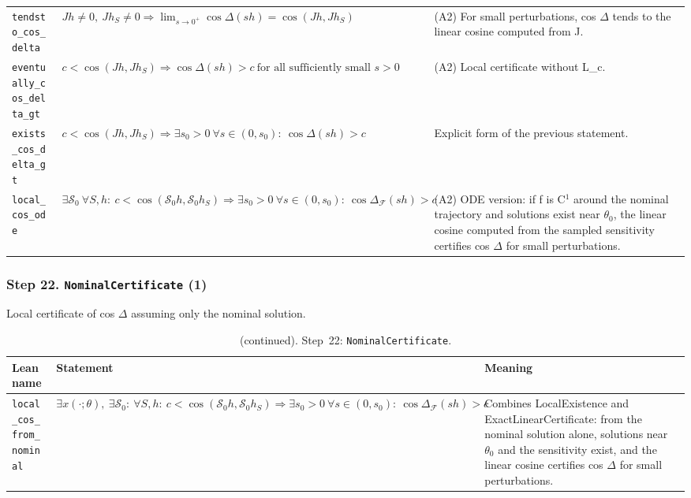 {\begin{longtable}{@{}>{\raggedright\arraybackslash}p{3.6cm}>{\raggedright\arraybackslash}p{6.6cm}>{\raggedright\arraybackslash}p{5.6cm}@{}}
\texttt{tendsto\_\allowbreak{}cos\_\allowbreak{}delta} & $\displaystyle Jh\ne0,\ Jh_S\ne0\Rightarrow\lim_{s\to0^+}\cos\Delta(sh)=\cos(Jh,Jh_S)$ & (A2) For small perturbations, cos $\Delta$ tends to the linear cosine computed from J. \\[3pt]
\texttt{eventually\_\allowbreak{}cos\_\allowbreak{}delta\_\allowbreak{}gt} & $\displaystyle c<\cos(Jh,Jh_S)\Rightarrow\cos\Delta(sh)>c\ \text{for all sufficiently small } s>0$ & (A2) Local certificate without L\_c. \\[3pt]
\texttt{exists\_\allowbreak{}cos\_\allowbreak{}delta\_\allowbreak{}gt} & $\displaystyle c<\cos(Jh,Jh_S)\Rightarrow\exists s_0>0\ \forall s\in(0,s_0):\ \cos\Delta(sh)>c$ & Explicit form of the previous statement. \\[3pt]
\texttt{local\_\allowbreak{}cos\_\allowbreak{}ode} & $\displaystyle \exists\mathcal S_0\ \forall S,h:\ c<\cos(\mathcal S_0h,\mathcal S_0h_S)\Rightarrow\exists s_0>0\ \forall s\in(0,s_0):\ \cos\Delta_{\mathcal F}(sh)>c$ & (A2) ODE version: if f is C$^1$ around the nominal trajectory and solutions exist near $\theta_0$, the linear cosine computed from the sampled sensitivity certifies cos $\Delta$ for small perturbations. \\[3pt]
\bottomrule
\end{longtable}
}

\subsubsection*{Step 22. \texttt{NominalCertificate} (1)}
Local certificate of cos $\Delta$ assuming only the nominal solution.

\addtocounter{table}{-1}
{\small
\begin{longtable}{@{}>{\raggedright\arraybackslash}p{3.6cm}>{\raggedright\arraybackslash}p{6.6cm}>{\raggedright\arraybackslash}p{5.6cm}@{}}
\caption[]{(continued). Step~22: \texttt{NominalCertificate}.}\\
\toprule
Lean name & Statement & Meaning \\
\midrule
\endhead
\texttt{local\_\allowbreak{}cos\_\allowbreak{}from\_\allowbreak{}nominal} & $\displaystyle \exists x(\cdot;\theta),\ \exists\mathcal S_0:\ \forall S,h:\ c<\cos(\mathcal S_0h,\mathcal S_0h_S)\Rightarrow\exists s_0>0\ \forall s\in(0,s_0):\ \cos\Delta_{\mathcal F}(sh)>c$ & Combines LocalExistence and ExactLinearCertificate: from the nominal solution alone, solutions near $\theta_0$ and the sensitivity exist, and the linear cosine certifies cos $\Delta$ for small perturbations. \\[3pt]
\bottomrule
\end{longtable}
}

